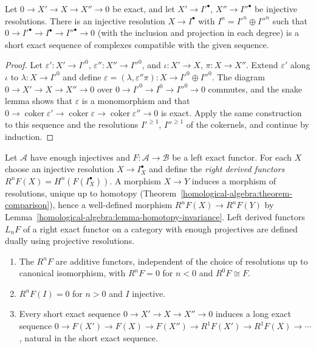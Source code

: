 \begin{lemma}\label{homological-algebra:lemma-horseshoe}
Let $0 \to X' \to X \to X'' \to 0$ be exact, and let $X' \to I'^\bullet$, $X'' \to I''^\bullet$ be injective resolutions. There is an
injective resolution $X \to I^\bullet$ with $I^n = I'^n \oplus I''^n$ such that $0 \to I'^\bullet \to I^\bullet \to I''^\bullet \to 0$ (with the
inclusion and projection in each degree) is a short exact sequence of complexes compatible with the given sequence.
\end{lemma}

\begin{proof}
Let $\varepsilon' \colon X' \to I'^0$, $\varepsilon'' \colon X'' \to I''^0$, and $\iota \colon X' \to X$, $\pi \colon X \to X''$. Extend $\varepsilon'$
along $\iota$ to $\lambda \colon X \to I'^0$ and define $\varepsilon = (\lambda, \varepsilon''\pi) \colon X \to I'^0 \oplus I''^0$. The diagram
$0 \to X' \to X \to X'' \to 0$ over $0 \to I'^0 \to I^0 \to I''^0 \to 0$ commutes, and the snake lemma shows that $\varepsilon$ is a
monomorphism and that $0 \to \operatorname{coker}\varepsilon' \to \operatorname{coker}\varepsilon \to \operatorname{coker}\varepsilon'' \to 0$ is exact. Apply the same
construction to this sequence and the resolutions $I'^{\geq 1}$, $I''^{\geq 1}$ of the cokernels, and continue by induction.
\end{proof}

\begin{definition}\label{homological-algebra:definition-derived-functor}
Let $\mathcal{A}$ have enough injectives and $F \colon \mathcal{A} \to \mathcal{B}$ be a left exact functor. For each $X$ choose an
injective resolution $X \to I_X^\bullet$ and define the \emph{right derived functors} $R^nF(X) = H^n(F(I_X^\bullet))$. A morphism
$X \to Y$ induces a morphism of resolutions, unique up to homotopy (Theorem~\ref{homological-algebra:theorem-comparison}),
hence a well-defined morphism $R^nF(X) \to R^nF(Y)$ by Lemma~\ref{homological-algebra:lemma-homotopy-invariance}. Left derived
functors $L_nF$ of a right exact functor on a category with enough projectives are defined dually using projective
resolutions.
\end{definition}

\begin{theorem}\label{homological-algebra:theorem-derived-functors}
\begin{enumerate}
\item The $R^nF$ are additive functors, independent of the choice of resolutions up to canonical isomorphism, with
$R^nF = 0$ for $n < 0$ and $R^0F \cong F$.
\item $R^nF(I) = 0$ for $n > 0$ and $I$ injective.
\item Every short exact sequence $0 \to X' \to X \to X'' \to 0$ induces a long exact sequence
$0 \to F(X') \to F(X) \to F(X'') \to R^1F(X') \to R^1F(X) \to \cdots$, natural in the short exact sequence.
\end{enumerate}
\end{theorem}

